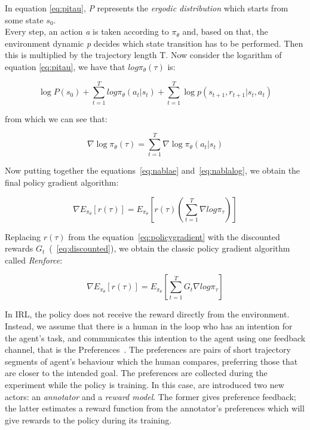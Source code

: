 In equation \ref{eq:pitau}, \textit{P} represents the \textsl{ergodic distribution} which starts from some state $s_{0}$. \\
Every step, an action \textit{a} is taken according to $\pi_{\theta}$ and, based on that, the environment dynamic \textit{p} decides which state transition has to be performed. Then this is multiplied by the trajectory length T. Now consider the logarithm of equation \ref{eq:pitau}, we have that $log\pi_{\theta}(\tau)$ is:

\begin{equation*}
    \log P(s_{0}) + \sum_{t=1}^{T} log\pi_{\theta}(a_{t}|s_{t}) + \sum_{t=1}^{T} \log p(s_{t+1},r_{t+1}|s_{t}, a_{t}) 
\end{equation*}

from which we can see that:

\begin{equation}\label{eq:nablalog}
    \nabla \log\pi_{\theta}(\tau) = \sum_{t=1}^{T}\nabla\log\pi_{\theta}(a_{t}|s_{t})
\end{equation}

Now putting together the equations\ \ref{eq:nablae} and\ \ref{eq:nablalog}, we obtain the final policy gradient algorithm:

\begin{equation}\label{eq:policygradient}
    \nabla E_{\pi_{\theta}}[r(\tau)] = E_{\pi_{\theta}}[r(\tau)(\sum_{t=1}^{T} \nabla log\pi_{\tau})]    
\end{equation}

Replacing $r(\tau)$ from the equation\ \ref{eq:policygradient} with the discounted rewards $G_{t}$\ (\ \ref{eq:discounted}), we obtain the classic policy gradient algorithm called \textsl{Renforce}:

\begin{equation}
    \nabla E_{\pi_{\theta}}[r(\tau)] = E_{\pi_{\theta}}[\sum_{t=1}^{T} G_{t} \nabla log\pi_{\tau}] 
\end{equation}

In IRL, the policy does not receive the reward directly from the environment. Instead,  we assume that there is a human in the loop who has an intention for the agent’s task, and communicates this intention to the agent using one feedback channel, that is the Preferences\ \cite{NIPS2018_8025}. The preferences are pairs of short trajectory segments of agent's behaviour which the human compares, preferring those that are closer to the intended goal.
The preferences are collected during the experiment while the policy is training. 
In this case, are introduced two new actors: an \textit{annotator} and a \textit{reward model}. The former gives preference feedback; the latter estimates a reward function from the annotator’s preferences which will give rewards to the policy during its training.
